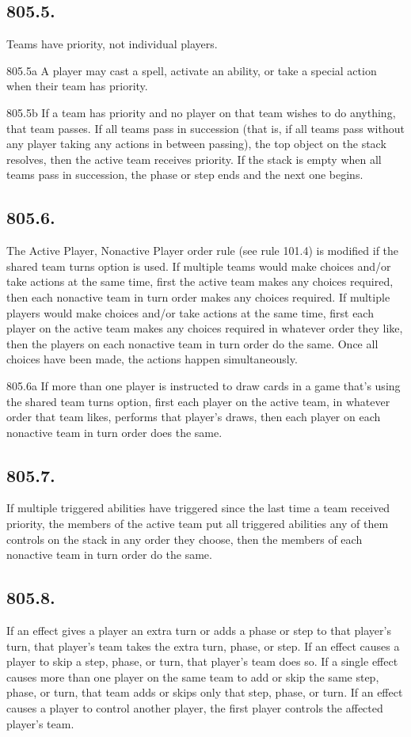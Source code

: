 \subsection*{805.5.}
Teams have priority, not individual players.

805.5a A player may cast a spell, activate an ability, or take a special action when their team has priority.

805.5b If a team has priority and no player on that team wishes to do anything, that team passes. If all teams pass in succession (that is, if all teams pass without any player taking any actions in between passing), the top object on the stack resolves, then the active team receives priority. If the stack is empty when all teams pass in succession, the phase or step ends and the next one begins.

\subsection*{805.6.}
The Active Player, Nonactive Player order rule (see rule 101.4) is modified if the shared team turns option is used. If multiple teams would make choices and/or take actions at the same time, first the active team makes any choices required, then each nonactive team in turn order makes any choices required. If multiple players would make choices and/or take actions at the same time, first each player on the active team makes any choices required in whatever order they like, then the players on each nonactive team in turn order do the same. Once all choices have been made, the actions happen simultaneously.

805.6a If more than one player is instructed to draw cards in a game that’s using the shared team turns option, first each player on the active team, in whatever order that team likes, performs that player’s draws, then each player on each nonactive team in turn order does the same.

\subsection*{805.7.}
If multiple triggered abilities have triggered since the last time a team received priority, the members of the active team put all triggered abilities any of them controls on the stack in any order they choose, then the members of each nonactive team in turn order do the same.

\subsection*{805.8.}
If an effect gives a player an extra turn or adds a phase or step to that player’s turn, that player’s team takes the extra turn, phase, or step. If an effect causes a player to skip a step, phase, or turn, that player’s team does so. If a single effect causes more than one player on the same team to add or skip the same step, phase, or turn, that team adds or skips only that step, phase, or turn. If an effect causes a player to control another player, the first player controls the affected player’s team.

